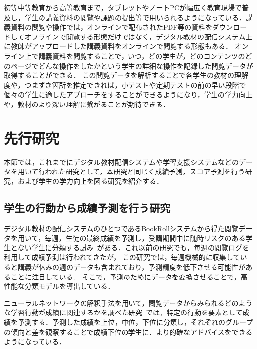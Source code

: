 \documentclass[a4paper,12pt]{ltjsreport}
\begin{document}
初等中等教育から高等教育まで，タブレットやノートPCが幅広く教育現場で普及し，学生の講義資料の閲覧や課題の提出等で用いられるようになっている．講義資料の閲覧や操作では，オンラインで配布されたPDF等の資料をダウンロードしてオフラインで閲覧する形態だけではなく，デジタル教材の配信システム上に教師がアップロードした講義資料をオンラインで閲覧する形態もある．
オンライン上で講義資料を閲覧することで，いつ，どの学生が，どのコンテンツのどのページでどんな操作をしたかという学生の詳細な操作を記録した閲覧データが取得することができる．
この閲覧データを解析することで各学生の教材の理解度や，つまずき箇所を推定できれば，小テストや定期テストの前の早い段階で個々の学生に適したアプローチをすることができるようになり，学生の学力向上や，教材のより深い理解に繋がることが期待できる．


\section{先行研究}\label{sec:pre}

本節では，これまでにデジタル教材配信システムや学習支援システムなどのデータを用いて行われた研究として，本研究と同じく成績予測，スコア予測を行う研究，および学生の学力向上を図る研究を紹介する．

\subsection{学生の行動から成績予測を行う研究}
デジタル教材の配信システムのひとつであるBookRollシステムから得た閲覧データを用いて，毎週，生徒の最終成績を予測し，受講期間中に随時リスクのある学生とない学生に分類する試み~\cite{Predictionstudentperformance2022}がある．これ以前の研究でも，毎週の閲覧ログを利用して成績予測は行われてきたが，
この研究では，毎週機械的に収集していると講義が休みの週のデータも含まれており，予測精度を低下させる可能性があることに注目している．
そこで，予測のためにデータを変換させることで，高性能な分類モデルを導出している．

ニューラルネットワークの解釈手法を用いて，閲覧データからみられるどのような学習行動が成績に関連するかを調べた研究~\cite{BR12020}では，特定の行動を要素として成績を予測する．予測した成績を上位，中位，下位に分類し，それぞれのグループの傾向と差を観察することで成績下位の学生に．より的確なアドバイスをできるようになっている．
\end{document}
